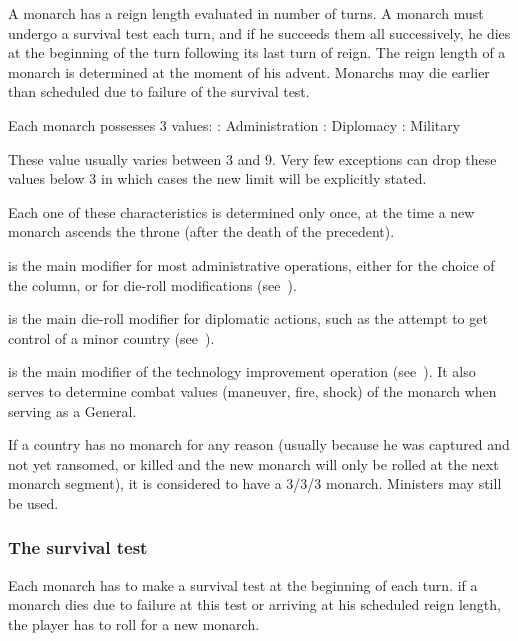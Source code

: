 A monarch has a reign length evaluated in number of
turns. A monarch must undergo a survival test each turn, and if he succeeds
them all successively, he dies at the beginning of the turn following its last
turn of reign. The reign length of a monarch is determined at the moment of
his advent.%
\bparag Monarchs may die earlier than scheduled due to failure of the survival
test.

 Each monarch possesses 3 values:
\bparag \ADM: Administration
\bparag \DIP: Diplomacy
\bparag \MIL: Military

\aparag These value usually varies between 3 and 9. Very few exceptions can
drop these values below 3 in which cases the new limit will be explicitly
stated.

\aparag Each one of these characteristics is determined only once, at the time
a new monarch ascends the throne (after the death of the precedent).

 \ADM is the main modifier for most
administrative operations, either for the choice of the column, or for
die-roll modifications (see~).

 \DIP is the main die-roll modifier for diplomatic
actions, such as the attempt to get control of a minor country
(see~).

 \MIL is the main modifier of the technology
improvement operation (see~). It
also serves to determine combat values (maneuver, fire, shock) of the monarch
when serving as a General.

\aparag[No monarch] If a country has no monarch for any reason (usually
because he was captured and not yet ransomed, or killed and the new monarch
will only be rolled at the next monarch segment), it is considered to have a
3/3/3 monarch.
\bparag Ministers may still be used.

\subsubsection{The survival test}
\aparag Each monarch has to make a survival test at the beginning of each
turn.
\bparag if a monarch dies due to failure at this test or arriving at his
scheduled reign length, the player has to roll for a new monarch.

